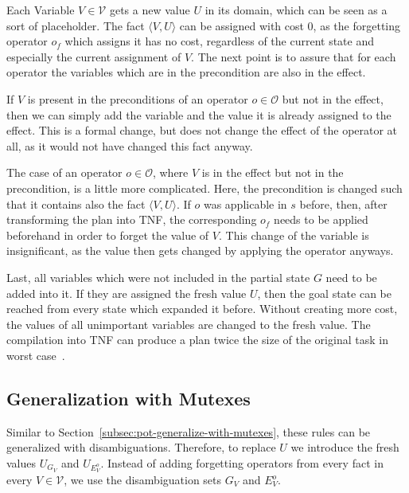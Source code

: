 Each Variable $V\in\mathcal{V}$ gets a new value $U$ in its domain, which can be seen as a sort of placeholder.
The fact $\langle V,U\rangle$ can be assigned with cost 0, as the forgetting operator $o_f$ which assigns it has no cost, regardless of the current state and especially the current assignment of $V$.
The next point is to assure that for each operator the variables which are in the precondition are also in the effect.

If $V$ is present in the preconditions of an operator $o\in\mathcal{O}$ but not in the effect, then we can simply add the variable and the value it is already assigned to the effect.
This is a formal change, but does not change the effect of the operator at all, as it would not have changed this fact anyway.

The case of an operator $o\in\mathcal{O}$, where $V$ is in the effect but not in the precondition, is a little more complicated.
Here, the precondition is changed such that it contains also the fact $\langle V, U\rangle$.
If $o$ was applicable in $s$ before, then, after transforming the plan into TNF, the corresponding $o_f$ needs to be applied beforehand in order to forget the value of $V$.
This change of the variable is insignificant, as the value then gets changed by applying the operator anyways.

Last, all variables which were not included in the partial state $G$ need to be added into it.
If they are assigned the fresh value $U$, then the goal state can be reached from every state which expanded it before.
Without creating more cost, the values of all unimportant variables are changed to the fresh value.
The compilation into TNF can produce a plan twice the size of the original task in worst case~\cite{seipp2015new}.

\subsection{Generalization with Mutexes}\label{subsec:tnf-generalize-with-mutexes}
Similar to Section~\ref{subsec:pot-generalize-with-mutexes}, these rules can be generalized with disambiguations.
Therefore, to replace $U$ we introduce the fresh values $U_{G_V}$ and $U_{E^o_V}$.
Instead of adding forgetting operators from every fact in every $V\in\mathcal{V}$, we use the disambiguation sets $G_V$ and $E_V^o$.

